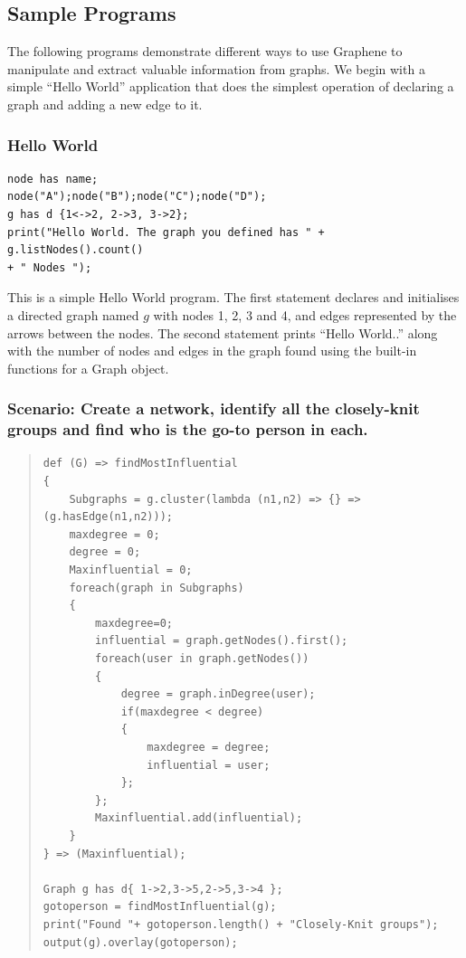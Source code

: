 \documentclass[a4paper]{article}
\begin{document}
\subsection{Sample Programs}

The following programs demonstrate different ways to use Graphene to manipulate and extract valuable information from graphs. We begin with a simple “Hello World” application that does the simplest operation of declaring a graph and adding a new edge to it.

\subsubsection{Hello World}

\begin{verbatim}
node has name;
node("A");node("B");node("C");node("D");
g has d {1<->2, 2->3, 3->2};
print("Hello World. The graph you defined has " + g.listNodes().count()
+ " Nodes ");
\end{verbatim}

\noindent This is a simple Hello World program. The first statement declares and initialises a directed graph named $g$ with nodes 1, 2, 3 and 4, and edges represented by the arrows between the nodes. The second statement prints “Hello World..” along with the number of nodes and edges in the graph found using the built-in functions for a Graph object.
\newline

\subsubsection{Scenario: Create a network, identify all the closely-knit groups and find
who is the go-to person in each.}
\begin{quote}
\begin{verbatim}
def (G) => findMostInfluential
{
    Subgraphs = g.cluster(lambda (n1,n2) => {} => (g.hasEdge(n1,n2)));
    maxdegree = 0;
    degree = 0;
    Maxinfluential = 0;
    foreach(graph in Subgraphs)
    {
        maxdegree=0;
        influential = graph.getNodes().first();
        foreach(user in graph.getNodes())
        {
            degree = graph.inDegree(user);
            if(maxdegree < degree)
            {
                maxdegree = degree;
                influential = user;
            };
        };
        Maxinfluential.add(influential);
    }
} => (Maxinfluential);

Graph g has d{ 1->2,3->5,2->5,3->4 };
gotoperson = findMostInfluential(g);
print("Found "+ gotoperson.length() + "Closely-Knit groups");
output(g).overlay(gotoperson);
\end{verbatim}
\end{quote}
\end{document}
